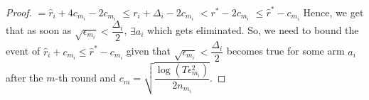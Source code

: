 \begin{proof}
\newline\hspace*{14em}$= \hat{r}_{i} + 4c_{m_{i}} - 2c_{m_{i}} $
\newline\hspace*{14em}$\leq r_{i} + \Delta_{i} - 2c_{m_{i}}$
\newline\hspace*{14em}$< r^{*} -2c_{m_{i}} $
\newline\hspace*{14em}$\leq \hat{r}^{*} - c_{m_{i}}$
\newline Hence, we get that as soon as $\sqrt{\epsilon_{m_{i}}}<\dfrac{\Delta_{i}}{2}$, $\exists a_{i}$ which gets eliminated.
\newline So, we need to bound the event of $\hat{r}_{i}+c_{m_{i}}\leq \hat{r}^{*}-c_{m_{i}}$ given that $\sqrt{\epsilon_{m_{i}}}<\dfrac{\Delta_{i}}{2}$ becomes true for some arm $a_{i}$ after the $m$-th round and $c_{m}=\sqrt{\dfrac{\log (T\epsilon_{m_{i}}^{2})}{2 n_{m_{i}}}}$.


\end{proof}
